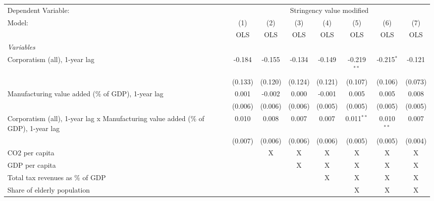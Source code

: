 
\begingroup
\centering
\begin{tabular}{lccccccc}
   \toprule
   Dependent Variable: & \multicolumn{7}{c}{Stringency value modified}\\
   Model:                                                                             & (1)     & (2)     & (3)     & (4)     & (5)           & (6)          & (7)\\  
                                                                                      &  OLS    & OLS     & OLS     & OLS     & OLS           & OLS          & OLS\\  
   \midrule
   \emph{Variables}\\
   Corporatism (all), 1-year lag                                                      & -0.184  & -0.155  & -0.134  & -0.149  & -0.219$^{**}$ & -0.215$^{*}$ & -0.121\\   
                                                                                      & (0.133) & (0.120) & (0.124) & (0.121) & (0.107)       & (0.106)      & (0.073)\\   
   Manufacturing value added (\% of GDP), 1-year lag                                  & 0.001   & -0.002  & 0.000   & -0.001  & 0.005         & 0.005        & 0.008\\   
                                                                                      & (0.006) & (0.006) & (0.006) & (0.005) & (0.005)       & (0.005)      & (0.005)\\   
   Corporatism (all), 1-year lag x Manufacturing value added (\% of GDP), 1-year lag  & 0.010   & 0.008   & 0.007   & 0.007   & 0.011$^{**}$  & 0.010$^{**}$ & 0.007\\   
                                                                                      & (0.007) & (0.006) & (0.006) & (0.006) & (0.005)       & (0.005)      & (0.004)\\   
   CO2 per capita                                                                     &         & X       & X       & X       & X             & X            & X\\  
   GDP per capita                                                                     &         &         & X       & X       & X             & X            & X\\  
   Total tax revenues as \% of GDP                                                    &         &         &         & X       & X             & X            & X\\  
   Share of elderly population                                                        &         &         &         &         & X             & X            & X\\  

\end{tabular}
